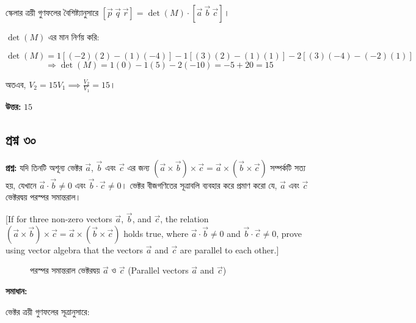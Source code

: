 \documentclass{article}
\begin{document}
স্কেলার ত্রয়ী গুণফলের বৈশিষ্ট্যানুসারে $[\vec{p} \ \vec{q} \ \vec{r}] = \det(M) \cdot [\vec{a} \ \vec{b} \ \vec{c}]$।

$\det(M)$ এর মান নির্ণয় করি:

$$\det(M) = 1[(-2)(2) - (1)(-4)] - 1[(3)(2) - (1)(1)] - 2[(3)(-4) - (-2)(1)]$$
$$\Rightarrow \det(M) = 1(0) - 1(5) - 2(-10) = -5 + 20 = 15$$

অতএব, $V_2 = 15 V_1 \implies \frac{V_2}{V_1} = 15$।

\textbf{উত্তর:} $15$

\hrulefill

\subsection*{প্রশ্ন ৩০}
\textbf{প্রশ্ন:} যদি তিনটি অশূন্য ভেক্টর $\vec{a}$, $\vec{b}$ এবং $\vec{c}$ এর জন্য $(\vec{a} \times \vec{b}) \times \vec{c} = \vec{a} \times (\vec{b} \times \vec{c})$ সম্পর্কটি সত্য হয়, যেখানে $\vec{a} \cdot \vec{b} \neq 0$ এবং $\vec{b} \cdot \vec{c} \neq 0$। ভেক্টর বীজগণিতের সূত্রাবলি ব্যবহার করে প্রমাণ করো যে, $\vec{a}$ এবং $\vec{c}$ ভেক্টরদ্বয় পরস্পর সমান্তরাল।

[If for three non-zero vectors $\vec{a}$, $\vec{b}$, and $\vec{c}$, the relation $(\vec{a} \times \vec{b}) \times \vec{c} = \vec{a} \times (\vec{b} \times \vec{c})$ holds true, where $\vec{a} \cdot \vec{b} \neq 0$ and $\vec{b} \cdot \vec{c} \neq 0$, prove using vector algebra that the vectors $\vec{a}$ and $\vec{c}$ are parallel to each other.]

\begin{figure}[h!]
\centering
{}
\caption{পরস্পর সমান্তরাল ভেক্টরদ্বয় $\vec{a}$ ও $\vec{c}$ (Parallel vectors $\vec{a}$ and $\vec{c}$)}
\end{figure}

\textbf{সমাধান:}

ভেক্টর ত্রয়ী গুণফলের সূত্রানুসারে:
\end{document}
